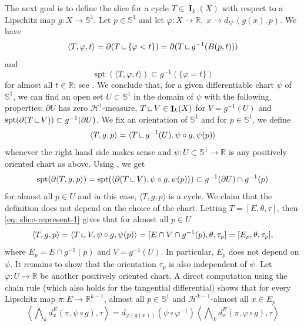 \documentclass{amsart}
\numberwithin{equation}{section}
\newcommand{\R}{\mathbb{R}}
\newcommand{\Ha}{\mathcal{H}}
\newcommand{\spt}{\operatorname{spt}}
\newcommand{\on}{\:\mbox{\rule{0.1ex}{1.2ex}\rule{1.1ex}{0.1ex}}\:}
\DeclareMathOperator{\bI}{\mathbf{I}}
\begin{document}
        The next goal is to define the slice for a cycle $T\in \bI_k(X)$ with respect to a Lipschitz map $g\colon X\to \mathbb{S}^1$. Let $p \in \mathbb{S}^1$ and let $\varphi\colon X \to \R,\; x \to d_{\mathbb{S}^1}(g(x),p)$. We have 
        $$\langle T, \varphi,t\rangle =  \partial(T\on\{\varphi<t\}) = \partial(T \on g^{-1}(B(p,t)))$$
        and 
        $$\spt\left( \langle T, \varphi,t\rangle \right) \subset g^{-1}(\{\varphi = t\})$$
        for almost all $t \in \R$; see \cite[Theorem 5.6]{ambrosio-kirchheim-2000}. We conclude that, for a given differentiable chart $\psi$ of $\mathbb{S}^1$, we can find an open set $U\subset \mathbb{S}^1$ in the domain of $\psi$ with the following properties: $\partial U $ has zero $\Ha^1$-measure, $T \on V \in \bI_k(X)$ for $V=g^{-1}(U)$ and $\spt(\partial (T\on V)) \subset g^{-1}(\partial U)$. We fix an orientation of $\mathbb{S}^1$ and for $p\in \mathbb{S}^1$, we define
        \begin{equation}\label{eq: def-slice-S1}
            \langle T,g,p\rangle = \langle T\on g^{-1}(U),\psi\circ g,\psi(p)\rangle
        \end{equation}
        whenever the right hand side makes sense and $\psi\colon U\subset \mathbb{S}^1\to \R$ is any positively oriented chart as above. Using \cite[Theorem 5.6]{ambrosio-kirchheim-2000}, we get
        $$\spt (\partial \langle T,g,p\rangle) = \spt  (\langle \partial (T\on V),\psi\circ g,\psi(p)\rangle)  \subset g^{-1}(\partial U) \cap g^{-1}(p) $$
        for almost all $p \in U$ and in this case, $\langle T,g,p\rangle$ is a cycle. We claim that the definition does not depend on the choice of the chart. Letting $T = [E,\theta,\tau]$, then \eqref{eq: slice-represent-1} gives that for almost all $p \in U$
        $$\langle T,g,p\rangle = \langle T\on V,\psi\circ g,\psi(p)\rangle = [E\cap V \cap g^{-1}(p),\theta,\tau_p] = [E_p,\theta,\tau_p],$$
        where $E_p = E\cap g^{-1}(p)$ and $V=g^{-1}(U)$. In particular, $E_p$ does not depend on $\psi$. It remains to show that the orientation $\tau_p$ is also independent of $\psi$. Let $\varphi\colon U \to \R$ be another positively oriented chart. A direct computation using the chain rule (which also holds for the tangential differential) shows that for every Lipschitz map $\pi\colon E \to \R^{k-1}$, almost all $p\in \mathbb{S}^1$ and $\Ha^{k-1}$-almost all $x \in E_p$
        $$\left\langle \bigwedge\nolimits_{k} d_x^{E}  (\pi, \psi\circ g), \tau \right\rangle = d_{\varphi(g(x))}(\psi\circ \varphi^{-1})  \left\langle \bigwedge\nolimits_{k} d_x^{E}  (\pi, \varphi\circ g), \tau \right\rangle  $$
\end{document}

